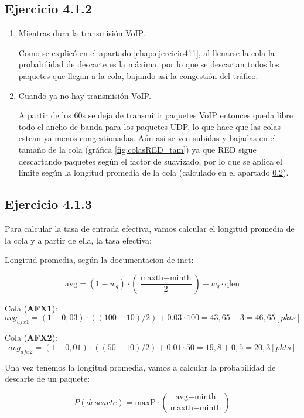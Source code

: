 \subsection{Ejercicio 4.1.2}
\begin{enumerate}
    \item Mientras dura la transmisión VoIP.
    
    Como se explicó en el apartado \ref{chap:ejercicio411}, al llenarse la cola la probabilidad de descarte es la máxima, por lo que se descartan
    todos los paquetes que llegan a la cola, bajando asi la congestión del tráfico.      

    \item Cuando ya no hay transmisión VoIP.
    
    A partir de los 60s se deja de transmitir paquetes VoIP entonces queda libre todo el ancho de banda para los paquetes UDP, 
    lo que hace que las colas estean ya menos congestionadas. Aún asi se ven subidas y bajadas en el tamaño de la cola (gráfica \ref{fig:colasRED_tam}) 
    ya que RED sigue descartando paquetes según el factor de suavizado, por lo que se aplica el límite según la longitud promedia de la cola (calculado en 
    el apartado \ref{text:calculos}).
    


\end{enumerate}

\subsection{Ejercicio 4.1.3} \label{text:calculos}

Para calcular la tasa de entrada efectiva, vamos calcular el longitud promedia de la cola y a partir de ella, la tasa efectiva:

Longitud promedia, según la documentacion de inet:

\[
\text{avg} = (1 - w_q) \cdot \left(\frac{\text{maxth} - \text{minth}}{2}\right) + w_q \cdot \text{qlen}
\]

Cola (\textbf{AFX1}):
\[
 avg_{afx1} = (1-0,03) \cdot \left((100-10)/2\right) + 0.03 \cdot 100 = 43,65 + 3 = 46,65 [pkts]
\]

Cola (\textbf{AFX2}):
\[
 avg_{afx2} = (1-0,01) \cdot \left((50-10)/2\right) + 0.01 \cdot 50 = 19,8 + 0,5 = 20,3 [pkts]
\]

Una vez tenemos la longitud promedia, vamos a calcular la probabilidad de descarte de un paquete:

\[
P(descarte) = \text{maxP} \cdot \left(\frac{\text{avg} - \text{minth}}{\text{maxth} - \text{minth}}\right)
\]

